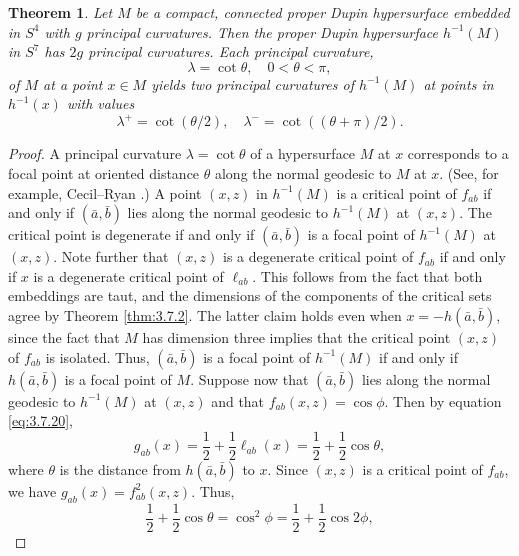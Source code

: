 \documentclass[12pt]{article}
\newtheorem{theorem}{Theorem}[section]
\begin{document}
\begin{theorem}
\label{thm:3.7.3} 
Let $M$ be a compact, connected proper Dupin hypersurface embedded in $S^4$ with $g$ principal curvatures.  
Then the proper Dupin hypersurface $h^{-1}(M)$ in $S^7$ has $2g$ principal curvatures.  Each principal curvature,
\begin{displaymath}
\lambda = \cot \theta, \quad 0 < \theta < \pi,
\end{displaymath}
of $M$ at a point $x \in M$ yields two principal curvatures of 
$h^{-1}(M)$ at points in $h^{-1}(x)$ with values
\begin{displaymath}
\lambda^{+} = \cot (\theta / 2), \quad \lambda^{-} = \cot ((\theta + \pi) / 2).
\end{displaymath}
\end{theorem}
\begin{proof}
A principal curvature $\lambda = \cot \theta$ of a hypersurface $M$ at $x$ corresponds to a 
focal point at oriented distance
$\theta$ along the normal geodesic to $M$ at $x$. 
(See, for example, Cecil--Ryan \cite[p. 127]{CR7}.)  A point $(x,z)$
in $h^{-1}(M)$ is a critical point of $f_{ab}$ if and only if $(\bar{a}, \bar{b})$ lies along the normal geodesic to
$h^{-1}(M)$ at $(x,z)$.  The critical point is degenerate if and only if $(\bar{a}, \bar{b})$ is a focal point of
$h^{-1}(M)$ at $(x,z)$.  Note further that $(x,z)$ is a degenerate critical point of $f_{ab}$ if and only if $x$
is a degenerate critical point of $\ell_{ab}$.  This follows from the fact that both embeddings are taut, and the
dimensions of the components of the critical sets agree by Theorem \ref{thm:3.7.2}.  The latter claim holds even
when $x = - h(\bar{a}, \bar{b})$, since the fact that $M$ has dimension three implies that the critical point
$(x,z)$ of $f_{ab}$ is isolated.  Thus, $(\bar{a}, \bar{b})$ is a focal point of $h^{-1}(M)$ if and only if
$h(\bar{a}, \bar{b})$ is a focal point of $M$.  Suppose now that $(\bar{a}, \bar{b})$ lies along the normal geodesic to
$h^{-1}(M)$ at $(x,z)$ and that $f_{ab}(x,z) = \cos \phi$.  Then by equation \eqref{eq:3.7.20},
\begin{displaymath}
g_{ab}(x) = \frac{1}{2} + \frac{1}{2} \ell_{ab} (x) = \frac{1}{2} + \frac{1}{2} \cos \theta,
\end{displaymath}
where $\theta$ is the distance from $h(\bar{a}, \bar{b})$ to $x$.  Since $(x,z)$ is a critical point of $f_{ab}$,
we have $g_{ab}(x) = f_{ab}^2 (x,z)$. Thus,
\begin{displaymath}
\frac{1}{2} + \frac{1}{2} \cos \theta = \cos^2 \phi = \frac{1}{2} + \frac{1}{2} \cos 2 \phi,

\end{displaymath}
\end{proof}
\end{document}
